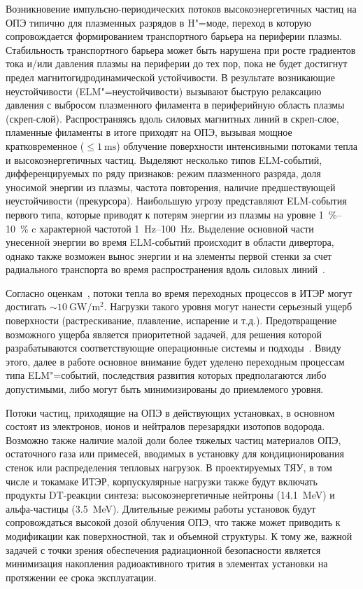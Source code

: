 Возникновение импульсно-периодических потоков высокоэнергетичных частиц на ОПЭ типично для плазменных разрядов в H"=моде, переход в которую сопровождается формированием транспортного барьера на периферии плазмы. Стабильность транспортного барьера может быть нарушена при росте градиентов тока и/или давления плазмы на периферии до тех пор, пока не будет достигнут предел магнитогидродинамической устойчивости. В результате возникающие неустойчивости (ELM"=неустойчивости) вызывают быструю релаксацию давления с выбросом плазменного филамента в периферийную область плазмы (скреп-слой). Распространяясь вдоль силовых магнитных линий в скреп-слое, пламенные филаменты в итоге приходят на ОПЭ, вызывая мощное кратковременное (\( \leq \SI{1}{\milli\second} \)) облучение поверхности интенсивными потоками тепла и высокоэнергетичных частиц. Выделяют несколько типов ELM-событий, дифференцируемых по ряду признаков: режим плазменного разряда, доля уносимой энергии из плазмы, частота повторения, наличие предшествующей неустойчивости (прекурсора). Наибольшую угрозу представляют ELM-события первого типа, которые приводят к потерям энергии из плазмы на уровне \SIrange{1}{10}{\percent} c характерной частотой \SIrange{1}{100}{\hertz}. Выделение основной части унесенной энергии во время ELM-событий происходит в области дивертора, однако также возможен вынос энергии и на элементы первой стенки за счет радиального транспорта во время распространения вдоль силовых линий~\cite{zohm1996edge,Krieger2025,Leonard2014}.

Согласно оценкам~\cite{Loarte2003, hender2007mhd, Pitts2017, Pitts2019}, потоки тепла во время переходных процессов в ИТЭР могут достигать $\sim\SI{10}{\giga\watt\per\meter\squared}$. Нагрузки такого уровня могут нанести серьезный ущерб поверхности (растрескивание, плавление, испарение и т.д.). Предотвращение возможного ущерба является приоритетной задачей, для решения которой разрабатываются соответствующие операционные системы и подходы~\cite{Lang2013,Evans2013,Lehnen2015}. Ввиду этого, далее в работе основное внимание будет уделено переходным процессам типа ELM"=событий, последствия развития которых предполагаются либо допустимыми, либо могут быть минимизированы до приемлемого уровня.

Потоки частиц, приходящие на ОПЭ в действующих установках, в основном состоят из электронов, ионов и нейтралов перезарядки изотопов водорода. Возможно также наличие малой доли более тяжелых частиц материалов ОПЭ, остаточного газа или примесей, вводимых в установку для кондиционирования стенок или распределения тепловых нагрузок. В проектируемых ТЯУ, в том числе и токамаке ИТЭР, корпускулярные нагрузки также будут включать продукты DT-реакции синтеза: высокоэнергетичные нейтроны (\SI{14.1}{\mega\electronvolt}) и альфа-частицы (\SI{3.5}{\mega\electronvolt}). Длительные режимы работы установок будут сопровождаться высокой дозой облучения ОПЭ, что также может приводить к модификации как поверхностной, так и объемной структуры. К тому же, важной задачей с точки зрения обеспечения радиационной безопасности является минимизация накопления радиоактивного трития в элементах установки на протяжении ее срока эксплуатации.

